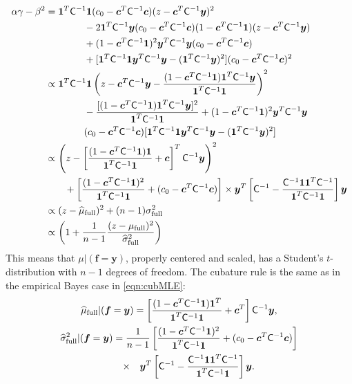 \documentclass[twocolumn]{svjour3}          %
\newcommand{\bm}[1]{\boldsymbol{#1}}
\newcommand{\vc}{\bm{c}}
\newcommand{\vf}{\bm{f}}
\newcommand{\vy}{\bm{y}}
\newcommand{\vone}{\bm{1}}
\newcommand{\mC}{\mathsf{C}}
\begin{document}
\begin{align*}
\alpha \gamma - \beta^2 
& = \vone^T \mC^{-1} \vone (c_0  -\vc ^T \mC^{-1} \vc) (z - \vc^T \mC^{-1} \vy )^2 \\
& \qquad \qquad - 2 \vone^T \mC^{-1} \vy (c_0  -\vc ^T \mC^{-1} \vc)(1 - \vc^T \mC^{-1} \vone)(z - \vc^T \mC^{-1} \vy ) \\
& \qquad \qquad + (1 - \vc^T \mC^{-1} \vone)^2 \vy^T \mC^{-1} \vy (c_0  -\vc ^T \mC^{-1} \vc) \\
&\qquad \qquad  + [\vone^T \mC^{-1} \vone \vy^T \mC^{-1} \vy - (\vone^T \mC^{-1} \vy)^2](c_0  -\vc ^T \mC^{-1} \vc)^2  \\
& \propto \vone^T \mC^{-1} \vone  \left (z - \vc^T \mC^{-1} \vy - \frac{(1 - \vc^T \mC^{-1} \vone)\vone^T \mC^{-1} \vy}{\vone^T \mC^{-1} \vone } \right )^2 \\
& \qquad \qquad -  \frac{[(1 - \vc^T \mC^{-1} \vone)\vone^T \mC^{-1} \vy]^2}{\vone^T \mC^{-1} \vone }  
+ (1 - \vc^T \mC^{-1} \vone)^2 \vy^T \mC^{-1} \vy \\
& \qquad \qquad (c_0  -\vc ^T \mC^{-1} \vc) [\vone^T \mC^{-1} \vone  \vy^T \mC^{-1} \vy
- (\vone^T \mC^{-1} \vy)^2] \\
& \propto \left (z - \left[ \frac{(1 - \vc^T \mC^{-1} \vone)\vone}{\vone^T \mC^{-1} \vone } + \vc \right]^T \mC^{-1} \vy \right )^2 \\
& \qquad  + \left[\frac{(1 - \vc^T \mC^{-1} \vone)^2}{\vone^T \mC^{-1} \vone} + (c_0  -\vc ^T \mC^{-1} \vc) \right] \times \vy^T\left[ \mC^{-1} 
- \frac{ \mC^{-1} \vone\vone^T \mC^{-1}}{\vone^T \mC^{-1} \vone}  \right]\vy
\\
& \propto (z - \widehat{\mu}_{\textup{full}})^2 + (n-1) \sigma_{\textup{full}}^2
\\
& \propto \left(1 +  \frac{1}{n-1} \frac{(z - \mu_{\textup{full}})^2}{\widehat{\sigma}_{\textup{full}}^2} \right)
\end{align*}
This means that $\mu \vert (\vf = \vy )$, properly centered and scaled, has a Student's $t$-distribution with $n-1$ degrees of freedom. The cubature rule is the same as in the empirical Bayes case in \eqref{eqn:cubMLE}:
\begin{gather}\label{FJH:eq:cubFull}
\widehat{\mu}_{\textup{full}}  \vert ( \vf = \vy) = \left[\frac{(1 -  \vc^T \mC^{-1}\vone)\vone^T}{\vone^T \mC^{-1} \vone} + \vc^T \right] \mC^{-1}  \vy,
\\
\label{FJH:eq:signmaFull}
\widehat{\sigma}^2_{\textup{full}}  \vert ( \vf = \vy)  
= \frac{1}{n-1}
\left[\frac{(1 - \vc^T \mC^{-1} \vone)^2}{\vone^T \mC^{-1} \vone} + (c_0  -\vc ^T \mC^{-1} \vc) \right] 
\\
\nonumber
\qquad \times \quad \vy^T\left[ \mC^{-1} 
- \frac{ \mC^{-1} \vone\vone^T \mC^{-1}}{\vone^T \mC^{-1} \vone}  \right]\vy .
\end{gather}
\end{document}
